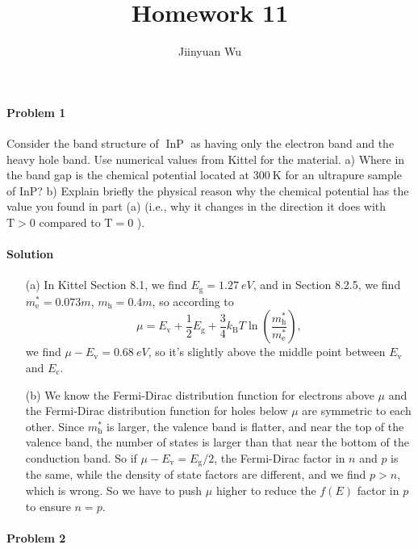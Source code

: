 \documentclass[hyperref, a4paper]{article}
\title{Homework 11}
\author{Jiinyuan Wu}
\begin{document}
    
\maketitle

\paragraph{Problem 1} Consider the band structure of $\operatorname{InP}$ as having only the electron band and the heavy hole band. Use numerical values from Kittel for the material.
a) Where in the band gap is the chemical potential located at $300 \mathrm{~K}$ for an ultrapure sample of InP?
b) Explain briefly the physical reason why the chemical potential has the value you found in part (a) (i.e., why it changes in the direction it does with $\mathrm{T}>0$ compared to $\mathrm{T}=0$ ).

\paragraph{Solution} \begin{itemize}
\item[(a)] In Kittel Section 8.1, we find $E_{\text{g}} = \SI{1.27}{eV}$, 
and in Section 8.2.5, we find $m^*_{\text{e}} = 0.073m$, 
$m_{\text{h}} = 0.4m$, 
so according to 
\begin{equation}
    \mu = E_{\text{v}} + \frac{1}{2} E_{\text{g}} + \frac{3}{4} k_{\text{B}} T \ln(\frac{m_\text{h}^*}{m_{\text{e}}^*}),
\end{equation}
we find $\mu - E_{\text{v}} = \SI{0.68}{eV}$, so it's slightly 
above the middle point between $E_{\text{v}}$ and $E_{\text{c}}$.

\item[(b)] We know the Fermi-Dirac distribution function for electrons above $\mu$
and the Fermi-Dirac distribution function for holes below $\mu$
are symmetric to each other.
Since $m^*_{\text{h}}$ is larger, 
the valence band is flatter,
and near the top of the valence band,
the number of states is larger than that near the bottom of the conduction band.
So if $\mu - E_{\text{v}} = E_{\text{g}} / 2$, 
the Fermi-Dirac factor in $n$ and $p$ is the same,
while the density of state factors are different, 
and we find $p > n$, which is wrong.
So we have to push $\mu$ higher to reduce the $f(E)$ factor in $p$
to ensure $n = p$.

\end{itemize}

\paragraph{Problem 2}
\end{document}
